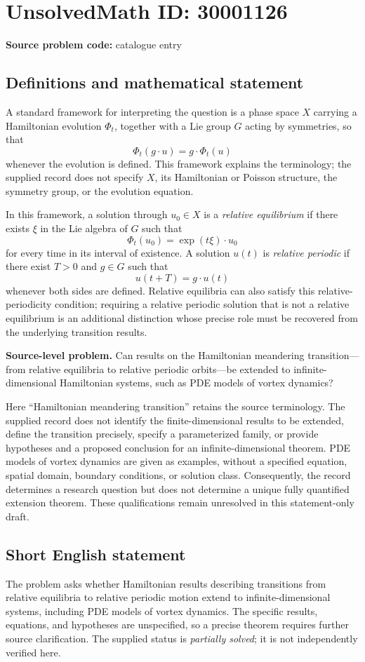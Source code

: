 \documentclass[11pt]{article}
\begin{document}
\section*{UnsolvedMath ID: 30001126}
\textbf{Source problem code:} catalogue entry
\subsection{Definitions and mathematical statement}
A standard framework for interpreting the question is a phase space \(X\) carrying a Hamiltonian evolution \(\Phi_t\), together with a Lie group \(G\) acting by symmetries, so that
\[
\Phi_t(g\cdot u)=g\cdot\Phi_t(u)
\]
whenever the evolution is defined. This framework explains the terminology; the supplied record does not specify \(X\), its Hamiltonian or Poisson structure, the symmetry group, or the evolution equation.

In this framework, a solution through \(u_0\in X\) is a \emph{relative equilibrium} if there exists \(\xi\) in the Lie algebra of \(G\) such that
\[
\Phi_t(u_0)=\exp(t\xi)\cdot u_0
\]
for every time in its interval of existence. A solution \(u(t)\) is \emph{relative periodic} if there exist \(T>0\) and \(g\in G\) such that
\[
u(t+T)=g\cdot u(t)
\]
whenever both sides are defined. Relative equilibria can also satisfy this relative-periodicity condition; requiring a relative periodic solution that is not a relative equilibrium is an additional distinction whose precise role must be recovered from the underlying transition results.

\textbf{Source-level problem.} Can results on the Hamiltonian meandering transition---from relative equilibria to relative periodic orbits---be extended to infinite-dimensional Hamiltonian systems, such as PDE models of vortex dynamics?

Here ``Hamiltonian meandering transition'' retains the source terminology. The supplied record does not identify the finite-dimensional results to be extended, define the transition precisely, specify a parameterized family, or provide hypotheses and a proposed conclusion for an infinite-dimensional theorem. PDE models of vortex dynamics are given as examples, without a specified equation, spatial domain, boundary conditions, or solution class. Consequently, the record determines a research question but does not determine a unique fully quantified extension theorem. These qualifications remain unresolved in this statement-only draft.
\subsection{Short English statement}
The problem asks whether Hamiltonian results describing transitions from relative equilibria to relative periodic motion extend to infinite-dimensional systems, including PDE models of vortex dynamics. The specific results, equations, and hypotheses are unspecified, so a precise theorem requires further source clarification. The supplied status is \emph{partially solved}; it is not independently verified here.
\end{document}
